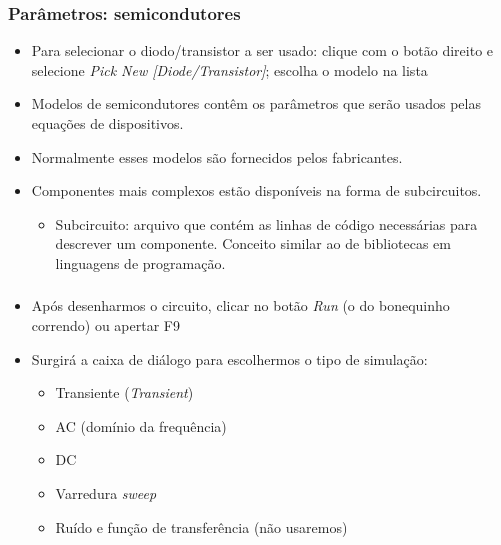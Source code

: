 \documentclass{beamer}
\begin{document}
\begin{frame}
\frametitle{Parâmetros: semicondutores}
\begin{itemize}
\item{Para selecionar o diodo/transistor a ser usado: clique com o botão direito e selecione \textit{Pick New [Diode/Transistor]}; escolha o modelo na lista}
\item{Modelos de semicondutores contêm os parâmetros que serão usados pelas equações de dispositivos.}
\item{Normalmente esses modelos são fornecidos pelos fabricantes.}
\item{Componentes mais complexos estão disponíveis na forma de subcircuitos.}
\begin{itemize}
\item{Subcircuito}: arquivo que contém as linhas de código necessárias para descrever um componente. Conceito similar ao de bibliotecas em linguagens de programação.
\end{itemize}
\end{itemize}
\end{frame}

\begin{frame}
\frametitle{}
\begin{itemize}
\item{Após desenharmos o circuito, clicar no botão \textit{Run} (o do bonequinho correndo) ou apertar F9}
\item{Surgirá a caixa de diálogo para escolhermos o tipo de simulação:}
\begin{itemize}
\item{Transiente (\textit{Transient})}
\item{AC (domínio da frequência)}
\item{DC}
\item{Varredura \textit{sweep}}
\item{Ruído e função de transferência (não usaremos)}
\end{itemize}
\end{itemize}
\end{frame}
\end{document}
